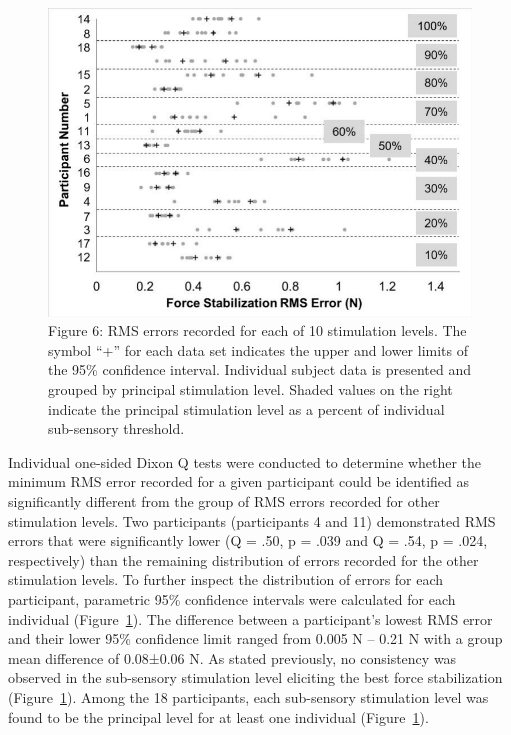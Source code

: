 \documentclass[]{cik}%
\begin{document}
\begin{figure}

{\centering \includegraphics[width=1\textwidth,height=\textheight]{./figures/fig6.pdf}

}

\caption{\label{fig-6}Figure 6: RMS errors recorded for each of 10
stimulation levels. The symbol ``+'' for each data set indicates the
upper and lower limits of the 95\% confidence interval. Individual
subject data is presented and grouped by principal stimulation level.
Shaded values on the right indicate the principal stimulation level as a
percent of individual sub-sensory threshold.}

\end{figure}

Individual one-sided Dixon Q tests were conducted to determine whether
the minimum RMS error recorded for a given participant could be
identified as significantly different from the group of RMS errors
recorded for other stimulation levels. Two participants (participants 4
and 11) demonstrated RMS errors that were significantly lower (Q = .50,
p = .039 and Q = .54, p = .024, respectively) than the remaining
distribution of errors recorded for the other stimulation levels. To
further inspect the distribution of errors for each participant,
parametric 95\% confidence intervals were calculated for each individual
(Figure~\ref{fig-6}). The difference between a participant's lowest RMS
error and their lower 95\% confidence limit ranged from 0.005 N -- 0.21
N with a group mean difference of 0.08±0.06 N. As stated previously, no
consistency was observed in the sub-sensory stimulation level eliciting
the best force stabilization (Figure~\ref{fig-6}). Among the 18
participants, each sub-sensory stimulation level was found to be the
principal level for at least one individual (Figure~\ref{fig-6}).
\end{document}

